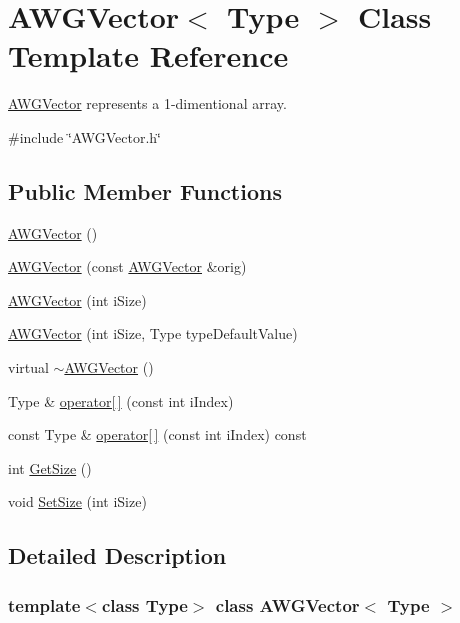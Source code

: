 \hypertarget{classAWGVector}{
\section{AWGVector$<$ Type $>$ Class Template Reference}
\label{classAWGVector}
}


\hyperlink{classAWGVector}{AWGVector} represents a 1-\/dimentional array.  


{\ttfamily \#include \char`\"{}AWGVector.h\char`\"{}}\subsection*{Public Member Functions}
\begin{DoxyCompactItemize}
\item 
\hyperlink{classAWGVector_a52d2aeaf8a3239b0fd5d48aceba3d050}{AWGVector} ()
\item 
\hyperlink{classAWGVector_a91bbe006772288e4942802ef734d2b4e}{AWGVector} (const \hyperlink{classAWGVector}{AWGVector} \&orig)
\item 
\hyperlink{classAWGVector_a3c2c1e2132e9777524c6509bafcb8133}{AWGVector} (int iSize)
\item 
\hyperlink{classAWGVector_a22692b3e4189d78d13b5828264374b8e}{AWGVector} (int iSize, Type typeDefaultValue)
\item 
virtual \hyperlink{classAWGVector_a0ac70e66f5a0b79ec3eeca0ebd24c566}{$\sim$AWGVector} ()
\item 
Type \& \hyperlink{classAWGVector_ac77f482986aaecdb71e4f2601e4836a7}{operator\mbox{[}$\,$\mbox{]}} (const int iIndex)
\item 
const Type \& \hyperlink{classAWGVector_aa6059d1f2e2d2e531a1fce5a03235175}{operator\mbox{[}$\,$\mbox{]}} (const int iIndex) const 
\item 
int \hyperlink{classAWGVector_abc39a471c9556aa62b9f19f06e399777}{GetSize} ()
\item 
void \hyperlink{classAWGVector_a0f4ea8cfdf8ae589597e2b347d8f6e61}{SetSize} (int iSize)
\end{DoxyCompactItemize}


\subsection{Detailed Description}
\subsubsection*{template$<$class Type$>$ class AWGVector$<$ Type $>$}

